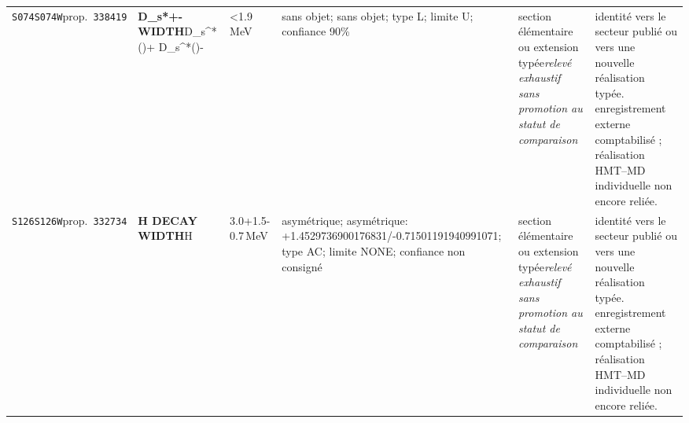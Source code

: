 \begin{landscape}
\begin{longtable}{L{1.85cm}L{4.45cm}L{2.35cm}L{4.05cm}L{3.35cm}L{7.15cm}}
\texttt{S074}\newline \texttt{S074W}\newline prop.\ \texttt{338419} & \textbf{D\_\allowbreak{}s*+- WIDTH}\newline D\_\allowbreak{}s\textasciicircum{}*()+ \textbar{}\allowbreak{} D\_\allowbreak{}s\textasciicircum{}*()- & \textless{}1.9\,MeV & sans objet; sans objet; type L; limite U; confiance 90\% & section élémentaire ou extension typée\newline \emph{relevé exhaustif sans promotion au statut de comparaison} & identité vers le secteur publié ou vers une nouvelle réalisation typée. enregistrement externe comptabilisé ; réalisation HMT--MD individuelle non encore reliée. \\
\texttt{S126}\newline \texttt{S126W}\newline prop.\ \texttt{332734} & \textbf{H DECAY WIDTH}\newline H & 3.0+1.5-0.7\,MeV & asymétrique; asymétrique: +1.4529736900176831/-0.71501191940991071; type AC; limite NONE; confiance non consigné & section élémentaire ou extension typée\newline \emph{relevé exhaustif sans promotion au statut de comparaison} & identité vers le secteur publié ou vers une nouvelle réalisation typée. enregistrement externe comptabilisé ; réalisation HMT--MD individuelle non encore reliée. \\
\end{longtable}
\endgroup
\end{landscape}
